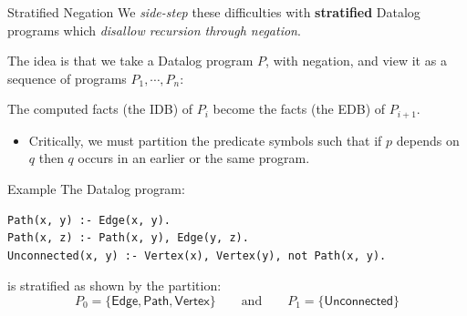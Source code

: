\begin{frame}{Stratified Negation}
We \emph{side-step} these difficulties with \textbf{stratified} Datalog programs
which \emph{disallow recursion through negation}.

The idea is that we take a Datalog program $P$, with negation, and view it as a
sequence of programs $P_1, \cdots, P_n$: 

\medskip

\begin{center}
\end{center}

The computed facts (the IDB) of $P_i$ become the facts (the EDB) of $P_{i + 1}$.
\begin{itemize}
    \item Critically, we must partition the predicate symbols such that if $p$
    depends on $q$ then $q$ occurs in an earlier or the same program. 
\end{itemize}
\end{frame}

\begin{frame}[fragile]{Example}
The Datalog program: 

\begin{lstlisting}[language=flix, xleftmargin=0.8cm]
Path(x, y) :- Edge(x, y).
Path(x, z) :- Path(x, y), Edge(y, z).
Unconnected(x, y) :- Vertex(x), Vertex(y), not Path(x, y).
\end{lstlisting}

\pause

is stratified as shown by the partition:
%
$$
P_0 = \{ \textsf{Edge}, \textsf{Path}, \textsf{Vertex} \} 
\qquad \text{and} \qquad
P_1 = \{ \textsf{Unconnected} \} 
$$
\end{frame}

